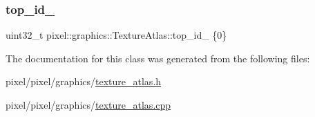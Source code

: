 \mbox{\label{classpixel_1_1graphics_1_1_texture_atlas_a937b633955dce94fc601fafa2ae072f6}} 
\subsubsection{\texorpdfstring{top\+\_\+id\+\_\+}{top\_id\_}}
{\footnotesize\ttfamily uint32\+\_\+t pixel\+::graphics\+::\+Texture\+Atlas\+::top\+\_\+id\+\_\+ \{0\}\hspace{0.3cm}{\ttfamily [private]}}



The documentation for this class was generated from the following files\+:\begin{DoxyCompactItemize}
\item 
pixel/pixel/graphics/\hyperlink{texture__atlas_8h}{texture\+\_\+atlas.\+h}\item 
pixel/pixel/graphics/\hyperlink{texture__atlas_8cpp}{texture\+\_\+atlas.\+cpp}\end{DoxyCompactItemize}
